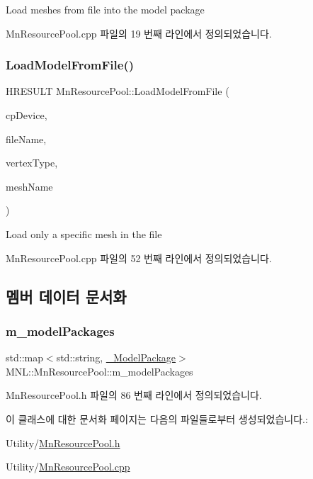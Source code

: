 Load meshes from file into the model package 

Mn\+Resource\+Pool.\+cpp 파일의 19 번째 라인에서 정의되었습니다.

\mbox{\label{class_m_n_l_1_1_mn_resource_pool_a3ed53e3938460f16c420f9968a6022a0}} 
\subsubsection{\texorpdfstring{Load\+Model\+From\+File()}{LoadModelFromFile()}\hspace{0.1cm}{\footnotesize\ttfamily [2/2]}}
{\footnotesize\ttfamily H\+R\+E\+S\+U\+LT Mn\+Resource\+Pool\+::\+Load\+Model\+From\+File (\begin{DoxyParamCaption}\item[{const \hyperlink{namespace_m_n_l_a1eec210db8f309a4a9ac0d9658784c31}{C\+P\+D3\+D\+Device} \&}]{cp\+Device,  }\item[{const std\+::string \&}]{file\+Name,  }\item[{const std\+::shared\+\_\+ptr$<$ \hyperlink{class_m_n_l_1_1_mn_custom_vertex_type}{Mn\+Custom\+Vertex\+Type} $>$ \&}]{vertex\+Type,  }\item[{const std\+::string \&}]{mesh\+Name }\end{DoxyParamCaption})}

Load only a specific mesh in the file 

Mn\+Resource\+Pool.\+cpp 파일의 52 번째 라인에서 정의되었습니다.



\subsection{멤버 데이터 문서화}
\mbox{\label{class_m_n_l_1_1_mn_resource_pool_a69859b0db46a6965a6d76b3598b33c73}} 
\subsubsection{\texorpdfstring{m\+\_\+model\+Packages}{m\_modelPackages}}
{\footnotesize\ttfamily std\+::map$<$std\+::string, \hyperlink{struct_m_n_l_1_1_mn_resource_pool_1_1___model_package}{\+\_\+\+Model\+Package}$>$ M\+N\+L\+::\+Mn\+Resource\+Pool\+::m\+\_\+model\+Packages\hspace{0.3cm}{\ttfamily [private]}}



Mn\+Resource\+Pool.\+h 파일의 86 번째 라인에서 정의되었습니다.



이 클래스에 대한 문서화 페이지는 다음의 파일들로부터 생성되었습니다.\+:\begin{DoxyCompactItemize}
\item 
Utility/\hyperlink{_mn_resource_pool_8h}{Mn\+Resource\+Pool.\+h}\item 
Utility/\hyperlink{_mn_resource_pool_8cpp}{Mn\+Resource\+Pool.\+cpp}\end{DoxyCompactItemize}
